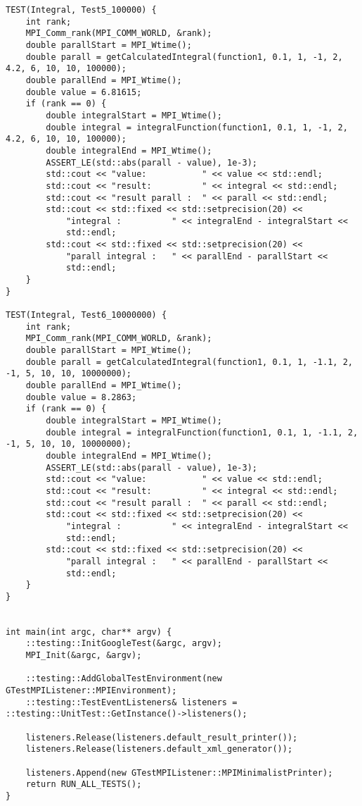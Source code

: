 \documentclass{report}
\begin{document}
\begin{lstlisting}
TEST(Integral, Test5_100000) {
    int rank;
    MPI_Comm_rank(MPI_COMM_WORLD, &rank);
    double parallStart = MPI_Wtime();
    double parall = getCalculatedIntegral(function1, 0.1, 1, -1, 2, 4.2, 6, 10, 10, 100000);
    double parallEnd = MPI_Wtime();
    double value = 6.81615;
    if (rank == 0) {
        double integralStart = MPI_Wtime();
        double integral = integralFunction(function1, 0.1, 1, -1, 2, 4.2, 6, 10, 10, 100000);
        double integralEnd = MPI_Wtime();
        ASSERT_LE(std::abs(parall - value), 1e-3);
        std::cout << "value:           " << value << std::endl;
        std::cout << "result:          " << integral << std::endl;
        std::cout << "result parall :  " << parall << std::endl;
        std::cout << std::fixed << std::setprecision(20) <<
            "integral :          " << integralEnd - integralStart <<
            std::endl;
        std::cout << std::fixed << std::setprecision(20) <<
            "parall integral :   " << parallEnd - parallStart <<
            std::endl;
    }
}

TEST(Integral, Test6_10000000) {
    int rank;
    MPI_Comm_rank(MPI_COMM_WORLD, &rank);
    double parallStart = MPI_Wtime();
    double parall = getCalculatedIntegral(function1, 0.1, 1, -1.1, 2, -1, 5, 10, 10, 10000000);
    double parallEnd = MPI_Wtime();
    double value = 8.2863;
    if (rank == 0) {
        double integralStart = MPI_Wtime();
        double integral = integralFunction(function1, 0.1, 1, -1.1, 2, -1, 5, 10, 10, 10000000);
        double integralEnd = MPI_Wtime();
        ASSERT_LE(std::abs(parall - value), 1e-3);
        std::cout << "value:           " << value << std::endl;
        std::cout << "result:          " << integral << std::endl;
        std::cout << "result parall :  " << parall << std::endl;
        std::cout << std::fixed << std::setprecision(20) <<
            "integral :          " << integralEnd - integralStart <<
            std::endl;
        std::cout << std::fixed << std::setprecision(20) <<
            "parall integral :   " << parallEnd - parallStart <<
            std::endl;
    }
}


int main(int argc, char** argv) {
    ::testing::InitGoogleTest(&argc, argv);
    MPI_Init(&argc, &argv);

    ::testing::AddGlobalTestEnvironment(new GTestMPIListener::MPIEnvironment);
    ::testing::TestEventListeners& listeners = ::testing::UnitTest::GetInstance()->listeners();

    listeners.Release(listeners.default_result_printer());
    listeners.Release(listeners.default_xml_generator());

    listeners.Append(new GTestMPIListener::MPIMinimalistPrinter);
    return RUN_ALL_TESTS();
}

\end{lstlisting}
\end{document}
